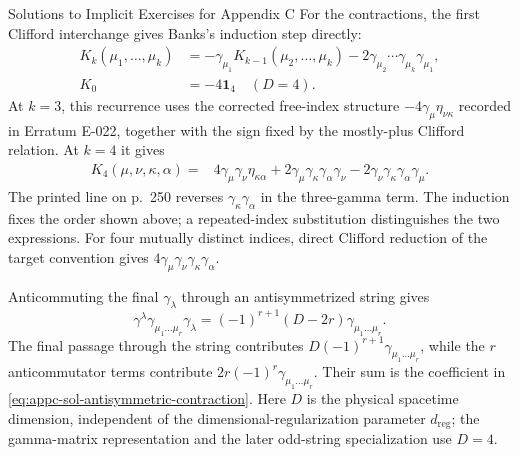 \begin{bankssolutions}{Solutions to Implicit Exercises for Appendix C}
For the contractions, the first Clifford interchange gives Banks's
induction step directly:
\begin{equation}
\begin{aligned}
 K_k(\mu_1,\ldots,\mu_k)
 &=-\gamma_{\mu_1}K_{k-1}(\mu_2,\ldots,\mu_k)
 -2\gamma_{\mu_2}\cdots\gamma_{\mu_k}\gamma_{\mu_1},\\
 K_0&=-4\mathbf 1_4\quad(D=4).
\end{aligned}
 \label{eq:appc-sol-contraction-recurrence}
\end{equation}
At $k=3$, this recurrence uses the corrected free-index structure
$-4\gamma_\mu\eta_{\nu\kappa}$ recorded in Erratum E-022, together with the
sign fixed by the mostly-plus Clifford relation. At $k=4$ it
gives
\begin{align*}
 K_4(\mu,\nu,\kappa,\alpha)={}&
 4\gamma_\mu\gamma_\nu\eta_{\kappa\alpha}
 +2\gamma_\mu\gamma_\kappa\gamma_\alpha\gamma_\nu
 -2\gamma_\nu\gamma_\kappa\gamma_\alpha\gamma_\mu.
\end{align*}
The printed line on p.~250 reverses $\gamma_\kappa\gamma_\alpha$ in the
three-gamma term. The induction fixes the order shown above; a
repeated-index substitution distinguishes the two expressions. For four
mutually distinct indices, direct Clifford reduction of the target
convention gives
$4\gamma_\mu\gamma_\nu\gamma_\kappa\gamma_\alpha$.

Anticommuting the final $\gamma_\lambda$ through an antisymmetrized string
gives
\begin{equation}
 \gamma^\lambda\gamma_{\mu_1\ldots\mu_r}\gamma_\lambda
 =(-1)^{r+1}(D-2r)\gamma_{\mu_1\ldots\mu_r}.
\label{eq:appc-sol-antisymmetric-contraction}
\end{equation}
The final passage through the string contributes
$D(-1)^{r+1}\gamma_{\mu_1\ldots\mu_r}$, while the $r$ anticommutator
terms contribute $2r(-1)^r\gamma_{\mu_1\ldots\mu_r}$. Their sum is the
coefficient in \eqref{eq:appc-sol-antisymmetric-contraction}. Here $D$ is the
physical spacetime dimension, independent of the dimensional-regularization
parameter $d_{\mathrm{reg}}$; the gamma-matrix representation and the later odd-string
specialization use $D=4$.


\end{bankssolutions}
